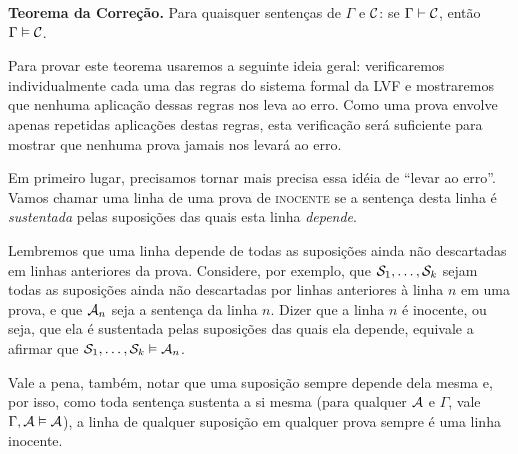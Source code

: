\begin{factoidboxe}\textbf
	{Teorema da Correção.} Para quaisquer sentenças de $\Gamma$ e $\mathcal{C}$: se $\Gamma\vdash\mathcal{C}$, então $\Gamma \vDash\mathcal{C}$.
\end{factoidboxe}

Para provar este teorema usaremos a seguinte ideia geral:
verificaremos individualmente cada uma das regras do sistema formal da LVF e mostraremos que nenhuma aplicação dessas regras nos leva ao erro.
Como uma prova envolve apenas repetidas aplicações destas regras, esta verificação será suficiente para mostrar que nenhuma prova jamais nos levará ao erro.

Em primeiro lugar, precisamos tornar mais precisa essa idéia de ``levar ao erro''.
Vamos chamar uma linha de uma prova de \textsc{inocente} se a sentença desta linha é \textit{sustentada} pelas suposições das quais esta linha \textit{depende}.

Lembremos que uma linha depende de todas as suposições ainda não descartadas em linhas anteriores da prova.
Considere, por exemplo, que $\mathcal{S}_1, \ldots, \mathcal{S}_k$ sejam todas as suposições ainda não descartadas por linhas anteriores à linha $n$ em uma prova, e que $\mathcal{A}_n$ seja a sentença da linha $n$.
Dizer que a linha $n$ é inocente, ou seja, que ela é sustentada pelas suposições das quais ela depende, equivale a afirmar que $\mathcal{S}_1, \ldots, \mathcal{S}_k \vDash \mathcal{A}_n$.

Vale a pena, também, notar que uma suposição sempre depende dela mesma e, por isso, como toda sentença sustenta a si mesma (para qualquer $\mathcal{A}$ e $\Gamma$, vale $\Gamma, \mathcal{A} \vDash \mathcal{A}$), a linha de qualquer suposição em qualquer prova sempre é uma linha inocente.

